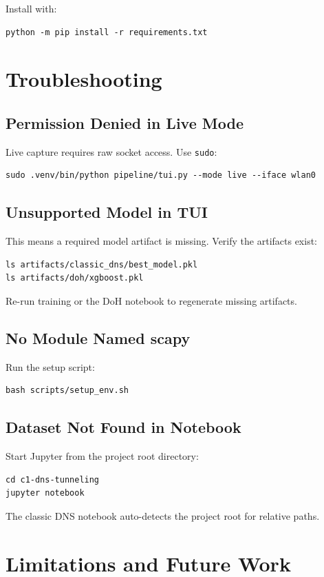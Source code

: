 \documentclass[12pt,a4paper]{article}
\begin{document}
Install with:
\begin{lstlisting}
python -m pip install -r requirements.txt
\end{lstlisting}

\section{Troubleshooting}

\subsection{Permission Denied in Live Mode}
Live capture requires raw socket access. Use \texttt{sudo}:
\begin{lstlisting}
sudo .venv/bin/python pipeline/tui.py --mode live --iface wlan0
\end{lstlisting}

\subsection{Unsupported Model in TUI}
This means a required model artifact is missing. Verify the artifacts exist:
\begin{lstlisting}
ls artifacts/classic_dns/best_model.pkl
ls artifacts/doh/xgboost.pkl
\end{lstlisting}
Re-run training or the DoH notebook to regenerate missing artifacts.

\subsection{No Module Named scapy}
Run the setup script:
\begin{lstlisting}
bash scripts/setup_env.sh
\end{lstlisting}

\subsection{Dataset Not Found in Notebook}
Start Jupyter from the project root directory:
\begin{lstlisting}
cd c1-dns-tunneling
jupyter notebook
\end{lstlisting}
The classic DNS notebook auto-detects the project root for relative paths.

\section{Limitations and Future Work}
\end{document}
